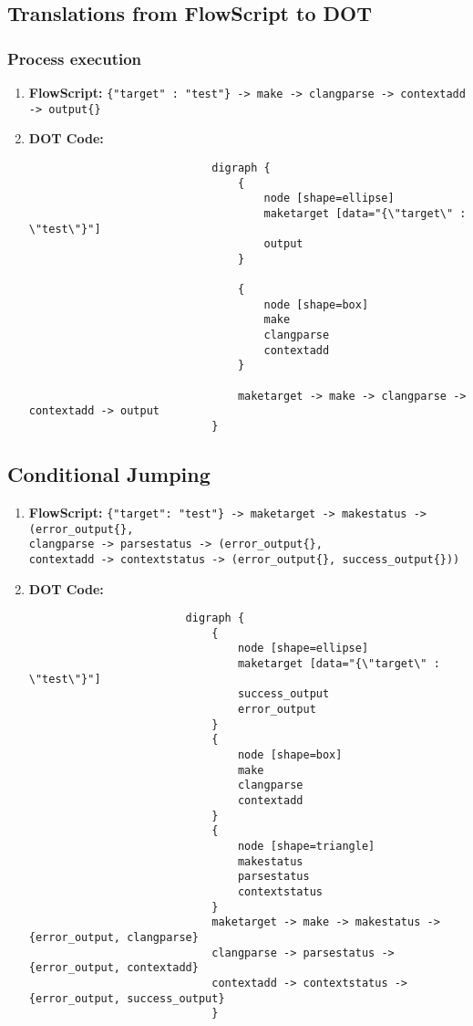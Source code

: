 \documentclass{article}
\begin{document}
		\subsection{Translations from FlowScript to DOT}
			\subsubsection{Process execution}
				\begin{enumerate}
					\item \textbf{FlowScript:} \texttt{\{"target" : "test"\} -> make -> clangparse -> contextadd -> output\{\}} \\
					\item \textbf{DOT Code:}
						\begin{verbatim}
							digraph {
							    {
							        node [shape=ellipse]
							        maketarget [data="{\"target\" : \"test\"}"]
							        output
							    }

							    {
							        node [shape=box]
							        make
							        clangparse
							        contextadd
							    }

							    maketarget -> make -> clangparse -> contextadd -> output
							}
						\end{verbatim}
				\end{enumerate}
			\subsection{Conditional Jumping}
				\begin{enumerate}
					\item \textbf{FlowScript:} \texttt{\{"target": "test"\} -> maketarget -> makestatus -> (error\_output\{\}, \\
						clangparse -> parsestatus -> (error\_output\{\}, \\
						contextadd -> contextstatus -> (error\_output\{\}, success\_output\{\}))} \\
					\item \textbf{DOT Code:} \begin{verbatim}
						digraph {
							{
								node [shape=ellipse]
								maketarget [data="{\"target\" : \"test\"}"]
								success_output
								error_output
							}
							{
								node [shape=box]
								make
								clangparse
								contextadd
							}
							{
								node [shape=triangle]
								makestatus 
								parsestatus
								contextstatus
							}
							maketarget -> make -> makestatus -> {error_output, clangparse}
							clangparse -> parsestatus -> {error_output, contextadd}
							contextadd -> contextstatus -> {error_output, success_output}
							}
						\end{verbatim}
				\end{enumerate}
\end{document}
